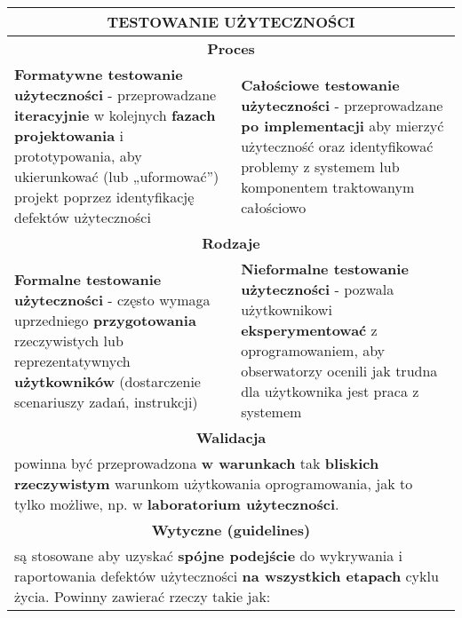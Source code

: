 \documentclass[../main.tex]{subfiles}
\begin{document}
    \begin{table}[H]
        \begin{center}
            \begin{tabular}{| p{8cm} | p{8cm} |}
                \hline
                \multicolumn{2}{|c|}{\textbf{TESTOWANIE UŻYTECZNOŚCI}}\\
                \hline
                \hline
                \multicolumn{2}{|c|}{\textbf{Proces}}\\
                \hline
                \textbf{Formatywne testowanie użyteczności} - przeprowadzane \textbf{iteracyjnie} w
                kolejnych \textbf{fazach projektowania} i prototypowania, aby ukierunkować
                (lub „uformować”) projekt poprzez identyfikację defektów użyteczności

                &
                \textbf{Całościowe testowanie użyteczności} - przeprowadzane \textbf{po implementacji}
                aby mierzyć użyteczność oraz identyfikować problemy z systemem
                lub komponentem traktowanym całościowo
                \\
                \hline
                \hline
                \multicolumn{2}{|c|}{\textbf{Rodzaje}}\\
                \hline
                \textbf{Formalne testowanie użyteczności} - często wymaga uprzedniego \textbf{przygotowania} rzeczywistych
                lub reprezentatywnych \textbf{użytkowników} (dostarczenie scenariuszy zadań, instrukcji)
                &
                \textbf{Nieformalne testowanie użyteczności} - pozwala użytkownikowi \textbf{eksperymentować} z
                oprogramowaniem, aby obserwatorzy ocenili jak trudna dla użytkownika jest praca z systemem\\
                \hline
                \hline
                \multicolumn{2}{|c|}{\textbf{Walidacja}}\\
                \hline
                \multicolumn{2}{|p{16cm}|}{powinna być przeprowadzona \textbf{w warunkach} tak \textbf{bliskich rzeczywistym} warunkom użytkowania
                oprogramowania, jak to tylko możliwe, np. w \textbf{laboratorium użyteczności}.}\\
                \hline
                \hline
                \multicolumn{2}{|c|}{\textbf{Wytyczne (guidelines)}}\\
                \hline
                \multicolumn{2}{|p{16cm}|}{są stosowane aby uzyskać \textbf{spójne podejście} do wykrywania i raportowania defektów
                użyteczności \textbf{na wszystkich etapach} cyklu życia. Powinny zawierać rzeczy takie jak:}\\

\end{tabular}
\end{center}
\end{table}
\end{document}
